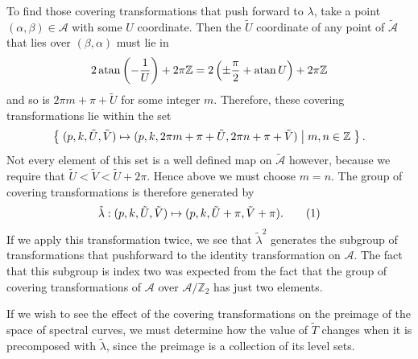 \documentclass{article}
\begin{document}
To find those covering transformations that push forward to $\lambda$, take a point $(\alpha,\beta) \in \mathcal{A}$ with some $U$ coordinate. Then the $\tilde{U}$ coordinate of any point of $\mathcal{\tilde{A}}$ that lies over $(\beta,\alpha)$ must lie in
\[
2\operatorname{atan} \left( -\frac{1}{U} \right) + 2\pi\mathbb{Z}
= 2\left(\pm\frac{\pi}{2} + \operatorname{atan} U\right) + 2\pi\mathbb{Z}
\]
and so is $2\pi m + \pi + \tilde{U}$ for some integer $m$. Therefore, these covering transformations lie within the set
\[
\left\{\; (p,k,\tilde{U},\tilde{V}) \mapsto (p,k, 2\pi m + \pi + \tilde{U}, 2\pi n + \pi + \tilde{V}) \;\middle|\; m,n \in \mathbb{Z} \;\right\}.
\]
Not every element of this set is a well defined map on $\mathcal{\tilde{A}}$ however, because we require that $\tilde{U} < \tilde{V} < \tilde{U} + 2\pi$. Hence above we must choose $m=n$. The group of covering transformations is therefore generated by
\[
\tilde{\lambda} : (p,k,\tilde{U},\tilde{V}) \mapsto (p,k, \tilde{U} + \pi, \tilde{V} + \pi).
\labelthis{eqn:tilde lambda action}
\]
If we apply this transformation twice, we see that $\tilde{\lambda}^2$ generates the subgroup of transformations that pushforward to the identity transformation on $\mathcal{A}$. The fact that  this subgroup is index two was expected from the fact that the group of covering transformations of $\mathcal{A}$ over $\mathcal{A}/\mathbb{Z}_2$ has just two elements.






If we wish to see the effect of the covering transformations on the preimage of the space of spectral curves, we must determine how the value of $\tilde{T}$ changes when it is precomposed with $\tilde{\lambda}$, since the preimage is a collection of its level sets.
\end{document}
